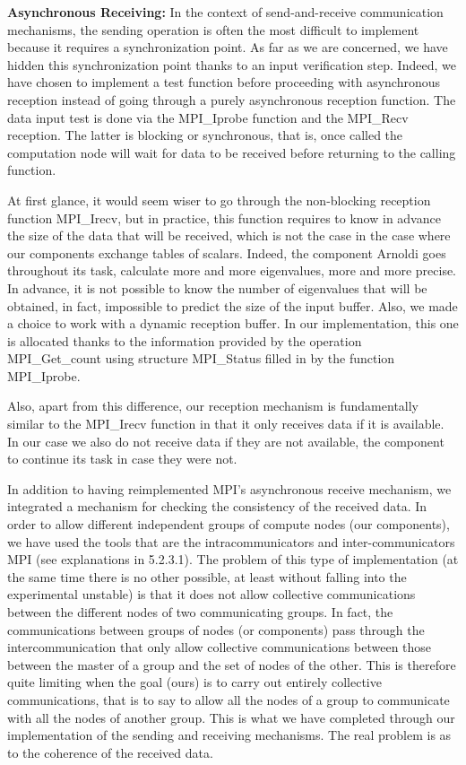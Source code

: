 \textbf{Asynchronous Receiving:} In the context of send-and-receive communication mechanisms, the sending operation is often the most difficult to implement because it requires a synchronization point. As far as we are concerned, we have hidden this synchronization point thanks to an input verification step. Indeed, we have chosen to implement a test function before proceeding with asynchronous reception instead of going through a purely asynchronous reception function. The data input test is done via the MPI\_Iprobe function and the MPI\_Recv reception. The latter is blocking or synchronous, that is, once called the computation node will wait for data to be received before returning to the calling function. 

At first glance, it would seem wiser to go through the non-blocking reception function MPI\_Irecv, but in practice, this function requires to know in advance the size of the data that will be received, which is not the case in the case where our components exchange tables of scalars. Indeed, the component Arnoldi goes throughout its task, calculate more and more eigenvalues, more and more precise. In advance, it is not possible to know the number of eigenvalues that will be obtained, in fact, impossible to predict the size of the input buffer. Also, we made a choice to work with a dynamic reception buffer. In our implementation, this one is allocated thanks to the information provided by the operation MPI\_Get\_count using structure MPI\_Status filled in by the function MPI\_Iprobe.

Also, apart from this difference, our reception mechanism is fundamentally similar to the MPI\_Irecv function in that it only receives data if it is available. In our case we also do not receive data if they are not available, the component to continue its task in case they were not. 

In addition to having reimplemented MPI's asynchronous receive mechanism, we integrated a mechanism for checking the consistency of the received data. In order to allow different independent groups of compute nodes (our components), we have used the tools that are the intracommunicators and inter-communicators MPI (see explanations in 5.2.3.1). The problem of this type of implementation (at the same time there is no other possible, at least without falling into the experimental unstable) is that it does not allow collective communications between the different nodes of two communicating groups. In fact, the communications between groups of nodes (or components) pass through the intercommunication that only allow collective communications between those between the master of a group and the set of nodes of the other. This is therefore quite limiting when the goal (ours) is to carry out entirely collective communications, that is to say to allow all the nodes of a group to communicate with all the nodes of another group. This is what we have completed through our implementation of the sending and receiving mechanisms. The real problem is as to the coherence of the received data.

